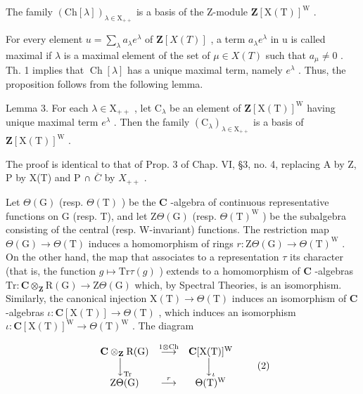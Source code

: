 The family \((\mathrm{Ch}[\lambda])_{\lambda\in\mathrm{X}_{++}}\) is a basis of the Z-module \(\mathbf{Z}[\mathrm{X}(\mathrm{T})]^{\mathrm{W}}\) .

For every element \(u = \sum_{\lambda} a_{\lambda} e^{\lambda}\) of \(\mathbf{Z}[X(T)]\) , a term \(a_{\lambda} e^{\lambda}\) in u is called maximal if \(\lambda\) is a maximal element of the set of \(\mu \in X(T)\) such that \(a_{\mu} \neq 0\) . Th. 1 implies that \(\operatorname{Ch}[\lambda]\) has a unique maximal term, namely \(e^{\lambda}\) . Thus, the proposition follows from the following lemma.

Lemma 3. For each \(\lambda \in \mathrm{X}_{++}\) , let \(\mathrm{C}_{\lambda}\) be an element of \(\mathbf{Z}[\mathrm{X(T)}]^{\mathrm{W}}\) having unique maximal term \(e^{\lambda}\) . Then the family \((\mathrm{C}_{\lambda})_{\lambda \in \mathrm{X}_{++}}\) is a basis of \(\mathbf{Z}[\mathrm{X(T)}]^{\mathrm{W}}\) .

The proof is identical to that of Prop. 3 of Chap. VI, §3, no. 4, replacing A by Z, P by X(T) and P ∩ \(\overline{C}\) by \(X_{++}\) .

Let \(\Theta (\mathrm{G})\) (resp. \(\Theta (\mathrm{T})\) ) be the \(\mathbf{C}\) -algebra of continuous representative functions on \(\mathrm{G}\) (resp. T), and let \(\mathrm{Z}\Theta (\mathrm{G})\) (resp. \(\Theta (\mathrm{T})^{\mathrm{W}}\) ) be the subalgebra consisting of the central (resp. W-invariant) functions. The restriction map \(\Theta (\mathrm{G})\to \Theta (\mathrm{T})\) induces a homomorphism of rings \(r:\mathrm{Z}\Theta (\mathrm{G})\rightarrow \Theta (\mathrm{T})^{\mathrm{W}}\) . On the other hand, the map that associates to a representation \(\tau\) its character (that is, the function \(g\mapsto \mathrm{Tr}\tau (g)\) ) extends to a homomorphism of \(\mathbf{C}\) -algebras \(\mathrm{Tr}:\mathbf{C}\otimes_{\mathbf{Z}}\mathrm{R}(\mathrm{G})\to \mathrm{Z}\Theta (\mathrm{G})\) which, by Spectral Theories, is an isomorphism. Similarly, the canonical injection \(\mathrm{X(T)}\to \Theta (\mathrm{T})\) induces an isomorphism of \(\mathbf{C}\) -algebras \(\iota :\mathbf{C}[\mathrm{X(T)}]\to \Theta (\mathrm{T})\) , which induces an isomorphism \(\iota :\mathbf{C}[\mathrm{X(T)}]^{\mathrm{W}}\to \Theta (\mathrm{T})^{\mathrm{W}}\) . The diagram

\[
\begin{array}{c c c} \mathbf {C} \otimes_ {\mathbf {Z}} \mathrm{R(G)} & \stackrel {{1 \otimes \mathrm{Ch}}} {{\longrightarrow}} & \mathbf {C} [ \mathrm{X(T)} ] ^ {\mathrm{W}} \\ \Big \downarrow_ {\mathrm{Tr}} & & \Big \downarrow_ {\iota} \\ \mathrm{Z} \Theta (\mathrm{G}) & \stackrel {{r}} {{\longrightarrow}} & \Theta (\mathrm{T}) ^ {\mathrm{W}} \end{array}\tag{2}
\]

